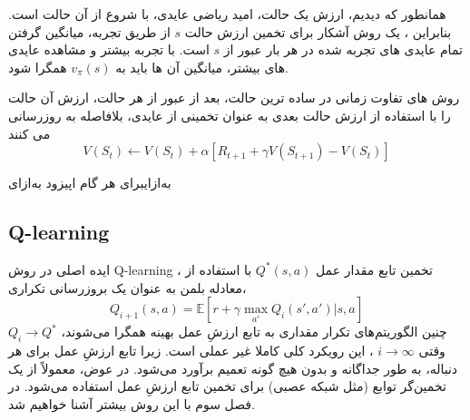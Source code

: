 همانطور که دیدیم، ارزش یک حالت، امید ریاضی عایدی، با شروع از آن حالت است.
بنابراین ، یک روش آشکار برای تخمین ارزش حالت $s$ از طریق تجربه، میانگین گرفتن تمام عایدی های تجربه شده در هر بار عبور از $s$ است.
با تجربه بیشتر و مشاهده عایدی های بیشتر، میانگین آن ها باید به $v_\pi(s)$ همگرا شود.

روش های تفاوت زمانی در ساده ترین حالت، بعد از عبور از هر حالت، ارزش آن حالت را با استفاده از ارزش حالت بعدی به عنوان تخمینی از عایدی، بلافاصله به روزرسانی می کنند
$$V(S_t) \longleftarrow V(S_t) + \alpha\left[R_{t+1} + \gamma V(S_{t+1}) - V(S_t)\right]$$

\‌به‌ازای{برای هر گام اپیزود}
‌به‌ازای


\subsection{Q-learning}
ایده اصلی در روش 
Q-learning
، تخمین تابع مقدار عمل  
$Q^*(s,a)$ 
با استفاده از معادله بلمن به عنوان یک بروزرسانی تکراری،
$$Q_{i+1}(s,a) = \mathbb{E}[r+ \gamma \max_{a'} Q_i(s',a')|s,a]$$
چنین الگوریتم‌های تکرار مقداری به تابع ارزشِ عمل بهینه همگرا می‌شوند، 
$Q_i \longrightarrow Q^*$
وقتی
$i \longrightarrow \infty$
، این رویکرد کلی کاملا غیر عملی است.
زیرا تابع ارزشِ عمل برای هر دنباله، به طور جداگانه و بدون هیچ گونه تعمیم برآورد می‌شود. در عوض، معمولاً از یک تخمین‌گر توابع (مثل شبکه عصبی) برای تخمین تابع ارزشِ عمل استفاده می‌شود. در فصل سوم با این روش بیشتر آشنا خواهیم شد.